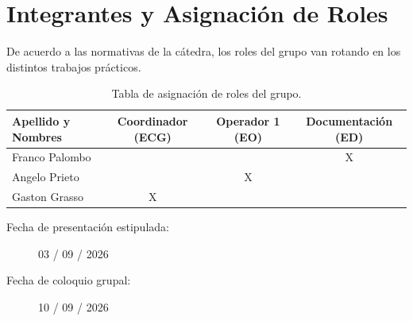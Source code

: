 \chapter{Integrantes y Asignación de Roles}
De acuerdo a las normativas de la cátedra, los roles del grupo van rotando en los distintos trabajos prácticos.

\begin{table}[H]
    \centering
    \begin{tabular}{|l|c|c|c|}
        \hline
        \textbf{Apellido y Nombres} & \textbf{Coordinador (ECG)} & \textbf{Operador 1 (EO)} & \textbf{Documentación (ED)} \\ \hline
        Franco Palombo & & & X \\ \hline
        Angelo Prieto & & X & \\ \hline
        Gaston Grasso & X & & \\ \hline
    \end{tabular}
    \caption{Tabla de asignación de roles del grupo.}
    \label{tab.roles:tp5}
\end{table}

\begin{description}
    \item[Fecha de presentación estipulada:] 03 / 09 / 2026
    \item[Fecha de coloquio grupal:] 10 / 09 / 2026
\end{description}
